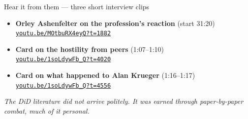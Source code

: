 \documentclass[aspectratio=169,11pt]{beamer}
\begin{document}
\begin{frame}{Hear it from them --- three short interview clips}
\vspace{0.5em}
\begin{itemize}
  \item \textbf{Orley Ashenfelter on the profession's reaction} (start 31:20) \\
        \href{https://youtu.be/MOtbuRX4eyQ?t=1882}{\color{ocean}\texttt{youtu.be/MOtbuRX4eyQ?t=1882}}
  \vspace{0.3em}
  \item \textbf{Card on the hostility from peers} (1:07--1:10) \\
        \href{https://youtu.be/1soLdywFb_Q?si=laAVYf_E2KBZKywG&t=4020}{\color{ocean}\texttt{youtu.be/1soLdywFb\_Q?t=4020}}
  \vspace{0.3em}
  \item \textbf{Card on what happened to Alan Krueger} (1:16--1:17) \\
        \href{https://youtu.be/1soLdywFb_Q?si=jsb8h50ZosGDnKrv&t=4556}{\color{ocean}\texttt{youtu.be/1soLdywFb\_Q?t=4556}}
\end{itemize}
\vspace{0.6em}
\begin{center}
\small\color{warmgray}\itshape
The DiD literature did not arrive politely. \;It was earned through paper-by-paper combat, much of it personal.
\end{center}
\end{frame}
\end{document}
